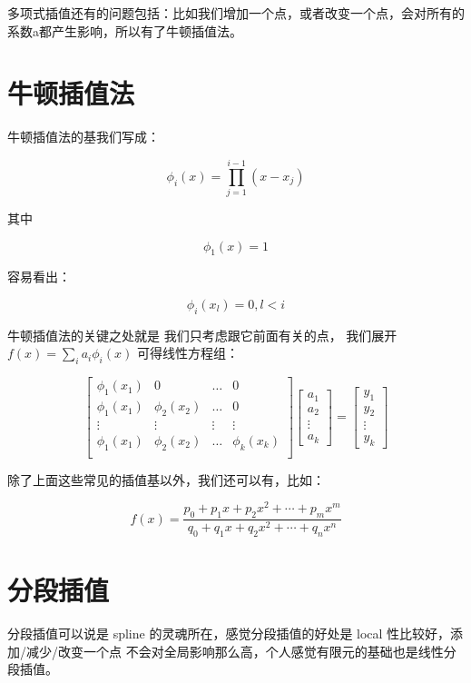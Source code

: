\documentclass[
]{book}
\begin{document}
多项式插值还有的问题包括：比如我们增加一个点，或者改变一个点，会对所有的系数a都产生影响，所以有了牛顿插值法。

\hypertarget{ux725bux987fux63d2ux503cux6cd5}{%
\section{牛顿插值法}\label{ux725bux987fux63d2ux503cux6cd5}}

牛顿插值法的基我们写成：

\[
\phi_i(x) = \prod_{j = 1}^{i - 1} (x - x_j)
\]

其中

\[
\phi_1(x) = 1
\]

容易看出：

\[
\phi_i(x_l) = 0, l < i
\]

牛顿插值法的关键之处就是 我们只考虑跟它前面有关的点， 我们展开 \(f(x) = \sum_i a_i \phi_i(x)\) 可得线性方程组：

\[
\begin{bmatrix}
\phi_1(x_1) & 0  & \ldots & 0 \\
\phi_1(x_1) & \phi_2(x_2)  & \ldots & 0 \\
\vdots & \vdots    & \vdots    &  \vdots   \\
\phi_1(x_1) & \phi_2(x_2)  & \ldots & \phi_k(x_k) \\
\end{bmatrix}
\begin{bmatrix} a_1 \\ a_2  \\ \vdots \\ a_k \end{bmatrix}  =
\begin{bmatrix} y_1 \\ y_2  \\ \vdots \\ y_k \end{bmatrix}
\]

除了上面这些常见的插值基以外，我们还可以有，比如：

\[
f(x) = \frac{p_0 + p_1x + p_2 x^2 + \cdots + p_m x^m}{q_0 + q_1x + q_2 x^2 + \cdots + q_n x^n}
\]

\hypertarget{ux5206ux6bb5ux63d2ux503c}{%
\section{分段插值}\label{ux5206ux6bb5ux63d2ux503c}}

分段插值可以说是 spline 的灵魂所在，感觉分段插值的好处是 local 性比较好，添加/减少/改变一个点 不会对全局影响那么高，个人感觉有限元的基础也是线性分段插值。
\end{document}
